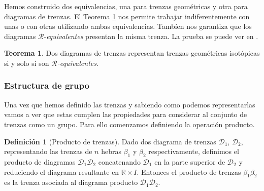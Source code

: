 \documentclass[12pt]{article}
\theoremstyle{definition}
\newtheorem{defi}{Definición}[section]
\newtheorem{teor}{Teorema}[section]
\begin{document}
Hemos construido dos equivalencias, una para trenzas geométricas y otra para diagramas de trenzas. El Teorema \ref{teor:equiv} nos permite trabajar indiferentemente con unas o con otras utilizando ambas equivalencias. Tambíen nos garantiza que los diagramas $\mathcal{R}$-\textit{equivalentes} presentan la misma trenza. La prueba se puede ver en \cite{br_gr}.


\begin{teor}
Dos diagramas de trenzas representan trenzas geométricas isotópicas si y solo si son $\mathcal{R}$\textit{-equivalentes}.
\label{teor:equiv}
\end{teor}




\subsubsection{Estructura de grupo}

Una vez que hemos definido las trenzas y sabiendo como podemos representarlas vamos a ver que estas cumplen las propiedades para considerar al conjunto de trenzas como un grupo. Para ello comenzamos definiendo la operación producto.

\begin{defi}[Producto de trenzas]
Dado dos diagrama de trenzas $\mathcal{D}_1$, $\mathcal{D}_2$, representando las trenzas de $n$ hebras $\beta_1$ y $\beta_2$ respectivamente, definimos el producto de diagramas $\mathcal{D}_1\mathcal{D}_2$ concatenando $\mathcal{D}_1$ en la parte superior de $\mathcal{D}_2$ y reduciendo el diagrama resultante en $\mathbb{R}\times I$. Entonces el producto de trenzas $\beta_1\beta_2$ es la trenza  asociada al diagrama producto $\mathcal{D}_1\mathcal{D}_2$.

\end{defi} 
\end{document}
